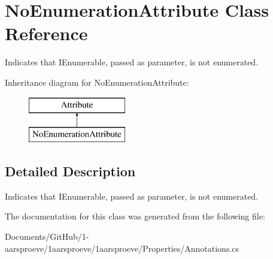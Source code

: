 \hypertarget{class_no_enumeration_attribute}{}\section{No\+Enumeration\+Attribute Class Reference}
\label{class_no_enumeration_attribute}


Indicates that I\+Enumerable, passed as parameter, is not enumerated.  


Inheritance diagram for No\+Enumeration\+Attribute\+:\begin{figure}[H]
\begin{center}
\leavevmode
\includegraphics[height=2.000000cm]{class_no_enumeration_attribute}
\end{center}
\end{figure}


\subsection{Detailed Description}
Indicates that I\+Enumerable, passed as parameter, is not enumerated. 



The documentation for this class was generated from the following file\+:\begin{DoxyCompactItemize}
\item 
Documents/\+Git\+Hub/1-\/aarsproeve/1aarsproeve/1aarsproeve/\+Properties/Annotations.\+cs\end{DoxyCompactItemize}
